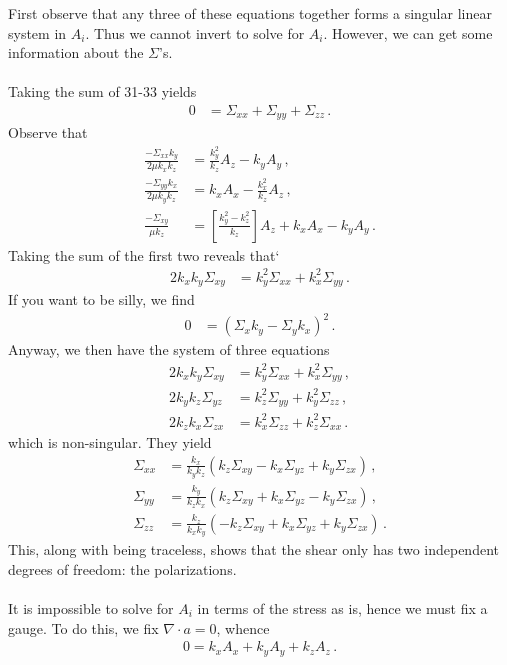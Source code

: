 \documentclass{article}
\newcommand*\p[1]{\left(#1\right)}
\newcommand*\ps[1]{\left[#1\right]}
\newcommand*\f[2]{\frac{#1}{#2}}
\begin{document}
First observe that any three of these equations together forms a singular linear system in $A_i$. Thus we cannot invert to solve for $A_i$. However, we can get some information about the $\Sigma$'s.
\\\\
Taking the sum of 31-33 yields
\begin{align}
0&=\Sigma_{xx}+\Sigma_{yy}+\Sigma_{zz}\,.
\end{align}
Observe that
\begin{align}
\f{-\Sigma_{xx}k_y}{2\mu k_xk_z}&=\f{k_y^2}{k_z}A_z-k_yA_y\,,\\
\f{-\Sigma_{yy}k_x}{2\mu k_yk_z}&=k_xA_x-\f{k_x^2}{k_z}A_z\,,\\
\f{-\Sigma_{xy}}{\mu k_z}&=\ps{\f{k_y^2-k_z^2}{k_z}}A_z+k_xA_x-k_yA_y\,.
\end{align}
Taking the sum of the first two reveals that`
\begin{align}
2k_xk_y\Sigma_{xy}&=k_y^2\Sigma_{xx}+k_x^2\Sigma_{yy}\,.
\end{align}
If you want to be silly, we find
\begin{align}
0&=(\Sigma_{x}k_y-\Sigma_{y}k_x)^2\,.
\end{align}
Anyway, we then have the system of three equations
\begin{align}
2k_xk_y\Sigma_{xy}&=k_y^2\Sigma_{xx}+k_x^2\Sigma_{yy}\,,\\
2k_yk_z\Sigma_{yz}&=k_z^2\Sigma_{yy}+k_y^2\Sigma_{zz}\,,\\
2k_zk_x\Sigma_{zx}&=k_x^2\Sigma_{zz}+k_z^2\Sigma_{xx}\,.
\end{align}
which is non-singular. They yield
\begin{align}
\Sigma_{xx}&=\f{k_x}{k_yk_z}\p{k_z\Sigma_{xy}-k_x\Sigma_{yz}+k_y\Sigma_{zx}}\,,\\
\Sigma_{yy}&=\f{k_y}{k_zk_x}\p{k_z\Sigma_{xy}+k_x\Sigma_{yz}-k_y\Sigma_{zx}}\,,\\
\Sigma_{zz}&=\f{k_z}{k_xk_y}\p{-k_z\Sigma_{xy}+k_x\Sigma_{yz}+k_y\Sigma_{zx}}\,.
\end{align}
This, along with being traceless, shows that the shear only has two independent degrees of freedom: the polarizations.
\\\\
It is impossible to solve for $A_i$ in terms of the stress as is, hence we must fix a gauge. To do this, we fix $\nabla\cdot a=0$, whence
\begin{align}
0=k_xA_x+k_yA_y+k_zA_z\,.
\end{align}
\end{document}
